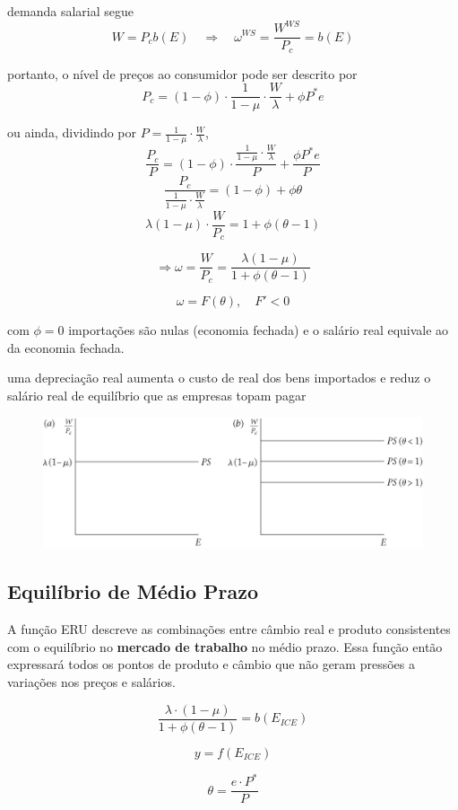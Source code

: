 \documentclass[a4paper,12pt]{article}[abntex2]
\begin{document}
demanda salarial segue
\[
W = P_c b(E)
\quad \Rightarrow \quad
\omega^{WS} = \frac{W^{WS}}{P_c} = b(E)
\]

portanto, o nível de preços ao consumidor pode ser descrito por
\[
P_c = (1 - \phi)\cdot \frac{1}{1 - \mu} \cdot \frac{W}{\lambda} + \phi P^* e
\]

ou ainda, dividindo por \(P = \frac{1}{1 - \mu} \cdot \frac{W}{\lambda}\),
\[
\frac{P_c}{P} = (1 - \phi)\cdot \frac{\frac{1}{1 - \mu} \cdot \frac{W}{\lambda}}{P} + \frac{\phi P^* e}{P}
\]
\[
\frac{P_c}{\frac{1}{1 - \mu} \cdot \frac{W}{\lambda}} = (1 - \phi) + \phi \theta
\]
\[
\lambda (1 - \mu) \cdot \frac{W}{P_c} = 1 + \phi(\theta - 1)
\]

\[
\Rightarrow \omega = \frac{W}{P_c} = \frac{\lambda (1 - \mu)}{1 + \phi(\theta - 1)}
\]

\[
\omega = F(\theta), \quad F' < 0
\]

com  \(\phi = 0\) importações são nulas (economia fechada) e o salário real equivale ao da economia fechada.

uma depreciação real aumenta o custo de real dos bens importados e reduz o salário real de equilíbrio que as empresas topam pagar

\begin{figure}[H]
    \centering
    \includegraphics[width=0.7\linewidth]{Imagens/a26i1.png}
\end{figure}

\subsection{\textbf{Equilíbrio de Médio Prazo}}
A função ERU descreve as combinações entre câmbio real e produto consistentes com o equilíbrio no \textbf{mercado de trabalho} no médio prazo. Essa função então expressará todos os pontos de produto e câmbio que não geram pressões a variações nos preços e salários. 

\[
\frac{\lambda \cdot (1 - \mu)}{1 + \phi (\theta - 1)} = b(E_{ICE})
\]

\[
y = f(E_{ICE})
\]

\[
\theta = \frac{e \cdot P^*}{P}
\]
\end{document}
